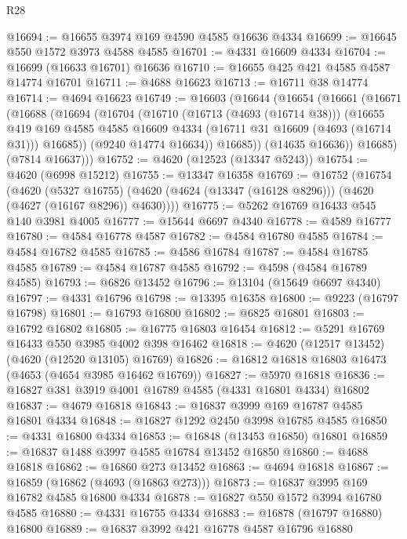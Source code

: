 \begin{lexlean}{R28}
\begin{coremodule}
@16694 := @16655 @3974 @169 @4590 @4585 @16636 @4334
@16699 := @16645 @550 @1572 @3973 @4588 @4585
@16701 := @4331 @16609 @4334
@16704 := @16699 (@16633 @16701) @16636
@16710 := @16655 @425 @421 @4585 @4587 @14774 @16701
@16711 := @4688 @16623
@16713 := @16711 @38 @14774
@16714 := @4694 @16623
@16749 := @16603
    (@16644
      (@16654
        (@16661
          (@16671
            (@16688
              (@16694
                (@16704
                  (@16710
                    (@16713 (@4693 (@16714 @38)))
                    (@16655
                      @419
                      @169
                      @4585
                      @4585
                      @16609
                      @4334
                      (@16711 @31 @16609 (@4693 (@16714 @31)))
                      @16685))
                  (@9240 @14774 @16634))
                @16685))
            (@14635 @16636))
          @16685)
        (@7814 @16637)))
@16752 := @4620 (@12523 (@13347 @5243))
@16754 := @4620 (@6998 @15212)
@16755 := @13347 @16358
@16769 := @16752
    (@16754
      (@4620
        (@5327 @16755)
        (@4620 (@4624 (@13347 (@16128 @8296))) (@4620 (@4627 (@16167 @8296)) @4630))))
@16775 := @5262 @16769 @16433 @545 @140 @3981 @4005
@16777 := @15644 @6697 @4340
@16778 := @4589 @16777
@16780 := @4584 @16778 @4587
@16782 := @4584 @16780 @4585
@16784 := @4584 @16782 @4585
@16785 := @4586 @16784
@16787 := @4584 @16785 @4585
@16789 := @4584 @16787 @4585
@16792 := @4598 (@4584 @16789 @4585)
@16793 := @6826 @13452
@16796 := @13104 (@15649 @6697 @4340)
@16797 := @4331 @16796
@16798 := @13395 @16358
@16800 := @9223 (@16797 @16798)
@16801 := @16793 @16800
@16802 := @6825 @16801
@16803 := @16792 @16802
@16805 := @16775 @16803 @16454
@16812 := @5291 @16769 @16433 @550 @3985 @4002 @398 @16462
@16818 := @4620 (@12517 @13452) (@4620 (@12520 @13105) @16769)
@16826 := @16812 @16818 @16803 @16473 (@4653 (@4654 @3985 @16462 @16769))
@16827 := @5970 @16818
@16836 := @16827 @381 @3919 @4001 @16789 @4585 (@4331 @16801 @4334) @16802
@16837 := @4679 @16818
@16843 := @16837 @3999 @169 @16787 @4585 @16801 @4334
@16848 := @16827 @1292 @2450 @3998 @16785 @4585
@16850 := @4331 @16800 @4334
@16853 := @16848 (@13453 @16850) @16801
@16859 := @16837 @1488 @3997 @4585 @16784 @13452 @16850
@16860 := @4688 @16818
@16862 := @16860 @273 @13452
@16863 := @4694 @16818
@16867 := @16859 (@16862 (@4693 (@16863 @273)))
@16873 := @16837 @3995 @169 @16782 @4585 @16800 @4334
@16878 := @16827 @550 @1572 @3994 @16780 @4585
@16880 := @4331 @16755 @4334
@16883 := @16878 (@16797 @16880) @16800
@16889 := @16837 @3992 @421 @16778 @4587 @16796 @16880

\end{coremodule}
\end{lexlean}
